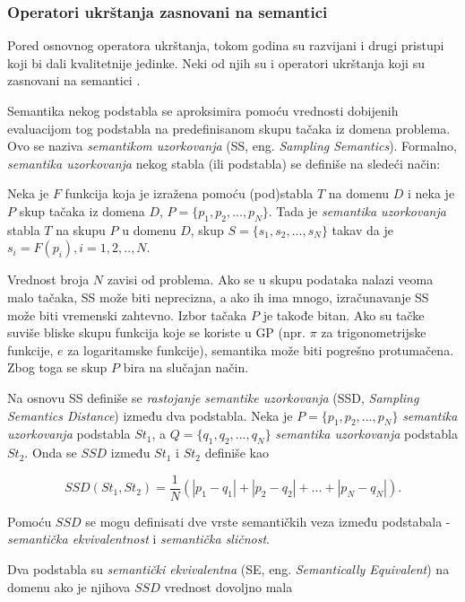 \documentclass[main.tex]{subfiles}
\begin{document}
\subsubsection{Operatori ukrštanja zasnovani na semantici}
\label{sec:semanticallyBasedCrossover}

Pored osnovnog operatora ukrštanja, tokom godina su razvijani i drugi pristupi koji bi dali kvalitetnije jedinke. Neki od njih su i operatori ukrštanja koji su zasnovani na semantici \cite{semanticCrossover}.

Semantika nekog podstabla se aproksimira pomoću vrednosti dobijenih evaluacijom tog podstabla na predefinisanom skupu tačaka iz domena problema. Ovo se naziva \textit{semantikom uzorkovanja} (SS, eng. \textit{Sampling Semantics}).
Formalno, \textit{semantika uzorkovanja} nekog stabla (ili podstabla) se definiše na sledeći način:

Neka je $F$ funkcija koja je izražena pomoću (pod)stabla $T$ na domenu $D$ i neka je $P$ skup tačaka iz domena $D$, $P = \{p_1, p_2, ..., p_N\}$. Tada je \textit{semantika uzorkovanja} stabla $T$ na skupu $P$ u domenu $D$, skup $S = \{s_1, s_2, ..., s_N\}$ takav da je $s_i = F(p_i), i=1,2,..,N$.

Vrednost broja $N$ zavisi od problema. Ako se u skupu podataka nalazi veoma malo tačaka, SS može biti neprecizna, a ako ih ima mnogo, izračunavanje SS može biti vremenski zahtevno. Izbor tačaka $P$ je takođe bitan. Ako su tačke suviše bliske skupu funkcija koje se koriste u GP (npr. $\pi$ za trigonometrijske funkcije, $e$ za logaritamske funkcije), semantika može biti pogrešno protumačena. Zbog toga se skup $P$ bira na slučajan način.

Na osnovu SS definiše se \textit{rastojanje semantike uzorkovanja} (SSD, \textit{Sampling Semantics Distance}) između dva podstabla. Neka je $P = \{p_1, p_2, ..., p_N\}$ \textit{semantika uzorkovanja} podstabla $St_1$, a $Q = \{q_1, q_2, ..., q_N\}$ \textit{semantika uzorkovanja} podstabla $St_2$. Onda se $SSD$ između $St_1$ i $St_2$ definiše kao

\[ SSD(St_1, St_2) = \frac{1}{N}(|p_1 - q_1| + |p_2 - q_2| + ... + |p_N - q_N|). \]

Pomoću $SSD$ se mogu definisati dve vrste semantičkih veza između podstabala - \textit{semantička ekvivalentnost} i \textit{semantička sličnost}.

Dva podstabla su \textit{semantički ekvivalentna} (SE, eng. \textit{Semantically Equivalent}) na domenu ako je njihova $SSD$ vrednost dovoljno mala
\end{document}
